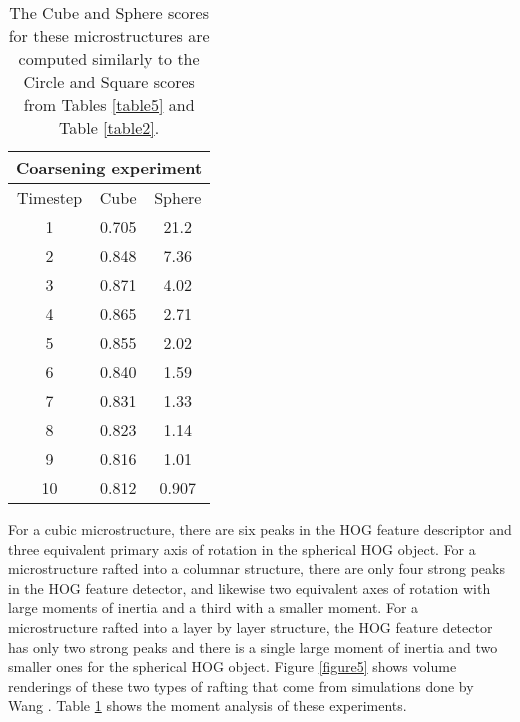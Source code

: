 \documentclass[review]{elsarticle}
\begin{document}
    \begin{table}[h]
      \begin{center}
      \begin{tabular}{ c | c | c }
        \multicolumn{3}{c}{Coarsening experiment} \\
        \hline
        Timestep & Cube & Sphere \\
        \hline
        1 & 0.705 & 21.2 \\
        2 & 0.848 & 7.36 \\
        3 & 0.871 & 4.02 \\
        4 & 0.865 & 2.71 \\
        5 & 0.855 & 2.02 \\
        6 & 0.840 & 1.59 \\
        7 & 0.831 & 1.33 \\
        8 & 0.823 & 1.14 \\
        9 & 0.816 & 1.01 \\
        10 & 0.812 & 0.907 \\
        \hline
      \end{tabular}
	  \label{table3}
	  \caption{ The Cube and Sphere scores for these microstructures are computed similarly to the Circle and Square scores from Tables \ref{table5} and Table \ref{table2}. }
	  \end{center}
  	\end{table}

    
	
	For a cubic microstructure, there are six peaks in the HOG feature descriptor and three equivalent primary axis of rotation in the spherical HOG object. For a microstructure rafted into a columnar structure, there are only four strong peaks in the HOG feature detector, and likewise two equivalent axes of rotation with large moments of inertia and a third with a smaller moment. For a microstructure rafted into a layer by layer structure, the HOG feature detector has only two strong peaks and there is a single large moment of inertia and two smaller ones for the spherical HOG object. Figure \ref{figure5} shows volume renderings of these two types of rafting that come from simulations done by Wang \cite{ywang2}. Table \ref{table3} shows the moment analysis of these experiments.
	
\end{document}
